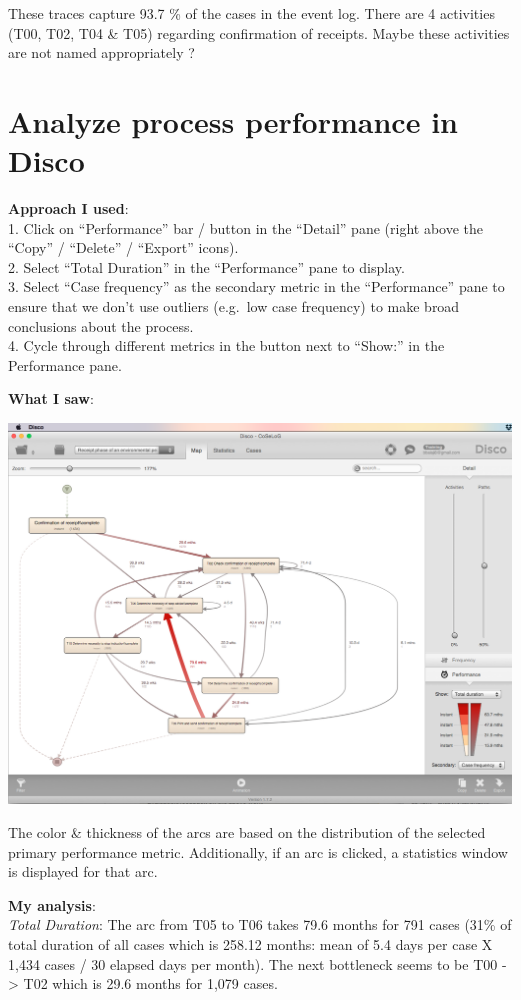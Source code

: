 \documentclass[]{article}
\begin{document}
These traces capture 93.7 \% of the cases in the event log. There are 4
activities (T00, T02, T04 \& T05) regarding confirmation of receipts.
Maybe these activities are not named appropriately ?

\section{Analyze process performance in
Disco}\label{analyze-process-performance-in-disco}

\textbf{Approach I used}:\\1. Click on ``Performance'' bar / button in
the ``Detail'' pane (right above the ``Copy'' / ``Delete'' / ``Export''
icons).\\2. Select ``Total Duration'' in the ``Performance'' pane to
display.\\3. Select ``Case frequency'' as the secondary metric in the
``Performance'' pane to ensure that we don't use outliers (e.g.~low case
frequency) to make broad conclusions about the process.\\4. Cycle
through different metrics in the button next to ``Show:'' in the
Performance pane.

\textbf{What I saw}:

\includegraphics{CoSeLoG_Step_03.png}

The color \& thickness of the arcs are based on the distribution of the
selected primary performance metric. Additionally, if an arc is clicked,
a statistics window is displayed for that arc.

\textbf{My analysis}:\\\emph{Total Duration}: The arc from T05 to T06
takes 79.6 months for 791 cases (31\% of total duration of all cases
which is 258.12 months: mean of 5.4 days per case X 1,434 cases / 30
elapsed days per month). The next bottleneck seems to be T00
-\textgreater{} T02 which is 29.6 months for 1,079 cases.
\end{document}
